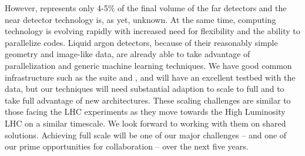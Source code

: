 However,  represents only 4-5\% of the final volume of the far detectors and the near detector technology is, as yet, unknown.  At the same time, computing technology is evolving rapidly with increased need for flexibility and the ability to parallelize codes.  Liquid argon detectors, because of their reasonably simple geometry and image-like data, are already able to take advantage of parallelization and generic machine learning techniques.  We have good common infrastructure such as the  suite and , and will have an excellent testbed with the  data,  but our techniques will need substantial adaption to scale to full  and to take full advantage of new architectures.  These scaling challenges are similar to those facing the LHC experiments as they move towards the High Luminosity LHC on a similar timescale. We look forward to working with them on shared solutions.  Achieving full scale will be one of our major challenges -- and  one of our prime opportunities for collaboration -- over the next five years.

